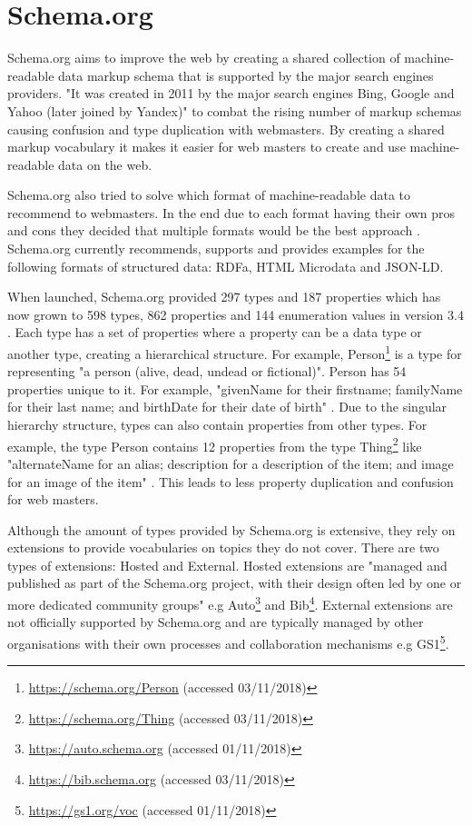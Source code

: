 \section{Schema.org}
\label{sec:schema}
Schema.org aims to improve the web by creating a shared collection of machine-readable data markup schema that is supported by the major search engines providers. "It was created in 2011 by the major search engines Bing, Google and Yahoo (later joined by Yandex)" \cite{guha2015schema} to combat the rising number of markup schemas causing confusion and type duplication with webmasters. By creating a shared markup vocabulary it makes it easier for web masters to create and use machine-readable data on the web.

Schema.org also tried to solve which format of machine-readable data to recommend to webmasters. In the end due to each format having their own pros and cons they decided that multiple formats would be the best approach \cite{guha2016schema}. Schema.org currently recommends, supports and provides examples for the following formats of structured data: RDFa, HTML Microdata and JSON-LD.

When launched, Schema.org provided 297 types and 187 properties \cite{guha2016schema} which has now grown to 598 types, 862 properties and 144 enumeration values in version 3.4 \cite{schemaExtensions}. Each type has a set of properties where a property can be a data type or another type, creating a hierarchical structure. For example, Person\footnote{\url{https://schema.org/Person} (accessed 03/11/2018)} is a type for representing "a person (alive, dead, undead or fictional)"\cite{schemaPerson}. Person has 54 properties unique to it. For example, "givenName for their firstname; familyName for their last name; and birthDate for their date of birth" \cite{schemaPerson}. Due to the singular hierarchy structure, types can also contain properties from other types. For example, the type Person contains 12 properties from the type Thing\footnote{\url{https://schema.org/Thing} (accessed 03/11/2018)} like "alternateName for an alias; description for a description of the item; and image for an image of the item" \cite{schemaPerson}. This leads to less property duplication and confusion for web masters.

Although the amount of types provided by Schema.org is extensive, they rely on extensions to provide vocabularies on topics they do not cover. There are two types of extensions: Hosted and External. Hosted extensions are "managed and published as part of the Schema.org project, with their design often led by one or more dedicated community groups" \cite{schemaExtensions}  e.g Auto\footnote{\url{https://auto.schema.org} (accessed 01/11/2018)}  and Bib\footnote{\url{https://bib.schema.org} (accessed 03/11/2018)}. External extensions are not officially supported by Schema.org and are typically managed by other organisations with their own processes and collaboration mechanisms \cite{schemaExtensions} e.g GS1\footnote{\url{https://gs1.org/voc} (accessed 01/11/2018)}. 

